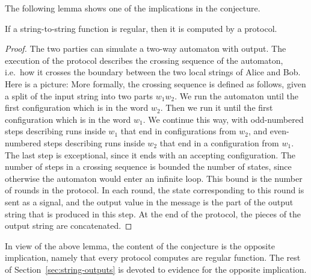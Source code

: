     The following lemma shows one of the implications in the conjecture.

\begin{lemma}\label{lem:from-regular-to-protocol}
    If a string-to-string function is regular, then it is computed by a protocol.
\end{lemma}
\begin{proof}
    The two parties can simulate a two-way automaton with output. The execution
    of the protocol describes the crossing sequence of the automaton, i.e.~how
    it crosses the boundary between the two local strings of Alice and Bob.
    Here is a picture:  More formally, the crossing sequence is
    defined as follows, given  a split of the input string into two parts $w_1
    w_2$. We run the automaton until the first configuration which is in the
    word $w_2$. Then we run it until the first configuration which is in the
    word $w_1$. We continue this way, with odd-numbered steps describing runs
    inside $w_1$ that end in  configurations from $w_2$, and even-numbered
    steps describing runs inside $w_2$ that end in a configuration from $w_1$.
    The last step is exceptional, since it ends with an accepting
    configuration. The number of steps in a crossing sequence is bounded  the
    number of states, since otherwise the automaton would enter an infinite
    loop. This bound is the number of rounds in the protocol. In each round,
    the state corresponding to this round is sent as a signal, and the output
    value in the message is the  part of the output string that is produced in
    this  step. At the end of the protocol, the pieces of the output string are
    concatenated. 
\end{proof}

In view of the above lemma, the content of the conjecture is the opposite
implication, namely that every protocol computes are regular function.  The
rest of Section~\ref{sec:string-outputs} is devoted to  evidence for the
opposite implication.


